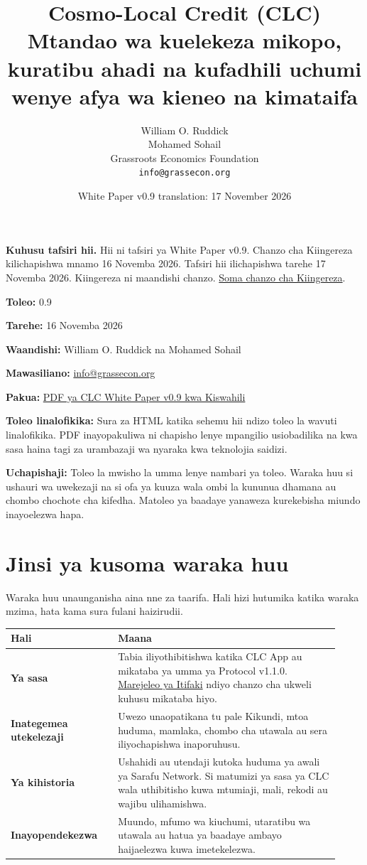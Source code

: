 \documentclass[11pt]{article}
\title{Cosmo-Local Credit (CLC)\\Mtandao wa kuelekeza mikopo, kuratibu ahadi na kufadhili uchumi wenye afya wa kieneo na kimataifa}
\author{William O. Ruddick \\ Mohamed Sohail \\ Grassroots Economics Foundation \\ \texttt{info@grassecon.org}}
\date{White Paper v0.9 translation: 17 November 2026}
\begin{document}
\maketitle
\tableofcontents
\newpage
\sloppy
\RaggedRight

\textbf{Kuhusu tafsiri hii.} Hii ni tafsiri ya White Paper v0.9. Chanzo cha Kiingereza kilichapishwa mnamo 16 Novemba 2026. Tafsiri hii ilichapishwa tarehe 17 Novemba 2026. Kiingereza ni maandishi chanzo. \href{https://docs.cosmolocal.credit/white-paper}{Soma chanzo cha Kiingereza}.

\textbf{Toleo:} 0.9

\textbf{Tarehe:} 16 Novemba 2026

\textbf{Waandishi:} William O. Ruddick na Mohamed Sohail

\textbf{Mawasiliano:} \href{mailto:info@grassecon.org}{info@grassecon.org}

\textbf{Pakua:} \href{https://docs.cosmolocal.credit/white-paper/Cosmo-Local-Credit-CLC-White-Paper-v9-sw.pdf}{PDF ya CLC White Paper v0.9 kwa Kiswahili}

\textbf{Toleo linalofikika:} Sura za HTML katika sehemu hii ndizo toleo la wavuti linalofikika. PDF inayopakuliwa ni chapisho lenye mpangilio usiobadilika na kwa sasa haina tagi za urambazaji wa nyaraka kwa teknolojia saidizi.

\textbf{Uchapishaji:} Toleo la mwisho la umma lenye nambari ya toleo. Waraka huu si ushauri wa uwekezaji na si ofa ya kuuza wala ombi la kununua dhamana au chombo chochote cha kifedha. Matoleo ya baadaye yanaweza kurekebisha miundo inayoelezwa hapa.

\section*{Jinsi ya kusoma waraka huu}

Waraka huu unaunganisha aina nne za taarifa. Hali hizi hutumika katika waraka mzima, hata kama sura fulani haizirudii.

\begin{longtable}{P{0.30\linewidth} P{0.62\linewidth}}
\toprule
Hali & Maana \\
\midrule
\endhead
\textbf{Ya sasa} & Tabia iliyothibitishwa katika CLC App au mikataba ya umma ya Protocol v1.1.0. \href{https://docs.cosmolocal.credit/sw/protocol/overview}{Marejeleo ya Itifaki} ndiyo chanzo cha ukweli kuhusu mikataba hiyo. \\
\textbf{Inategemea utekelezaji} & Uwezo unaopatikana tu pale Kikundi, mtoa huduma, mamlaka, chombo cha utawala au sera iliyochapishwa inaporuhusu. \\
\textbf{Ya kihistoria} & Ushahidi au utendaji kutoka huduma ya awali ya Sarafu Network. Si matumizi ya sasa ya CLC wala uthibitisho kuwa mtumiaji, mali, rekodi au wajibu ulihamishwa. \\
\textbf{Inayopendekezwa} & Muundo, mfumo wa kiuchumi, utaratibu wa utawala au hatua ya baadaye ambayo haijaelezwa kuwa imetekelezwa. \\
\bottomrule
\end{longtable}
\end{document}
